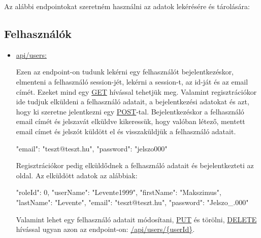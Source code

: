 
Az alábbi endpointokat szeretném használni az adatok lekérésére és tárolására:

\subsection{Felhasználók}
\begin{itemize}[label={$\bullet$}, topsep=0pt, itemsep=0pt, leftmargin=15pt]
    \item[] {\url{api/users:}}
          \begin{addmargin}[\parindent]{0pt}
              Ezen az endpoint-on tudunk lekérni egy felhasználót bejelentkezéskor, elmenteni a felhasználó session-jét, lekérni a session-t, az id-ját és az email címét. Ezeket mind egy \url{GET} hívással tehetjük meg. Valamint regisztrációkor ide tudjuk elküldeni a felhasználó adatait, a bejelentkezési adatokat és azt, hogy ki szeretne jelentkezni egy \url{POST}-tal. Bejelentkezéskor a felhasználó email címét és jelszavát elküldve kikeressük, hogy valóban létező, mentett email címet és jelszót küldött el és visszaküldjük a felhasználó adatait.
              \begin{json}
{
    "email": "teszt@teszt.hu",
    "password": "jelszo000"
}
              \end{json}

              Regisztrációkor pedig elküldődnek a felhasználó adatait és bejelentkezteti az oldal. Az elküldött adatok az alábbiak:

              \begin{json}
{
    "roleId": 0,
    "userName": "Levente1999",
    "firstName": "Makszimus",
    "lastName": "Levente",
    "email": "teszt@teszt.hu",
    "password": "Jelszo_.000"
}
              \end{json}

              Valamint lehet egy felhasználó adatait módosítani, \url{PUT} és törölni, \url{DELETE} hívással ugyan azon az endpoint-on: \url{/api/users/{userId}}.
          \end{addmargin}
\end{itemize}

